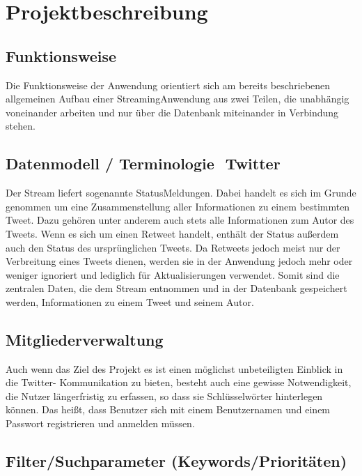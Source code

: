 \chapter{Projektbeschreibung}

\section{Funktionsweise} 

Die Funktionsweise der Anwendung orientiert sich am bereits beschriebenen allgemeinen Aufbau
einer Streaming­Anwendung aus zwei Teilen, die unabhängig voneinander arbeiten und nur über
die Datenbank miteinander in Verbindung stehen.

\section{Datenmodell / Terminologie ­ Twitter}

Der Stream liefert sogenannte Status­Meldungen. Dabei handelt es sich im Grunde genommen um
eine Zusammenstellung aller Informationen zu einem bestimmten Tweet. Dazu gehören unter
anderem auch stets alle Informationen zum Autor des Tweets. Wenn es sich um einen Retweet
handelt, enthält der Status außerdem auch den Status des ursprünglichen Tweets. Da Retweets
jedoch meist nur der Verbreitung eines Tweets dienen, werden sie in der Anwendung jedoch mehr
oder weniger ignoriert und lediglich für Aktualisierungen verwendet. Somit sind die zentralen
Daten, die dem Stream entnommen und in der Datenbank gespeichert werden, Informationen zu
einem Tweet und seinem Autor.

\section{Mitgliederverwaltung}

Auch wenn das Ziel des Projekt es ist einen möglichst unbeteiligten Einblick in die Twitter-
Kommunikation zu bieten, besteht auch eine gewisse Notwendigkeit, die Nutzer längerfristig zu
erfassen, so dass sie Schlüsselwörter hinterlegen können. Das heißt, dass Benutzer sich mit einem
Benutzernamen und einem Passwort registrieren und anmelden müssen.

\section{Filter­/Suchparameter (Keywords/Prioritäten)}

